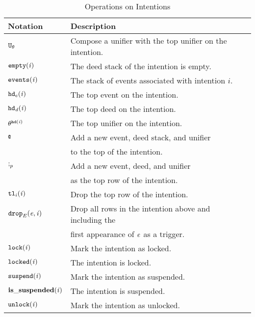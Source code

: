 \begin{table}
\begin{tabular}{llp{7cm}}
Notation  & Description \\ \hline
${\tt U}_{\theta}$ &  Compose a unifier with the top
unifier on the intention. \\


${\tt empty}(\mathit{i})$ & The deed stack of the intention
is empty. \\

${\tt events}(\mathit{i})$ & The
stack of events associated with intention $i$. \\

${\tt hd}_e(\mathit{i})$ & The top
event on the intention\index{intention!top event}. \\

$\mathit{{\tt hd}_d}(\mathit{i})$ & The top
deed on the intention\index{intention!top deed}. \\


$\theta^{{\tt hd}(\mathit{i})}$ & The top
unifier on the intention. \\

$\AILconcat$ & Add a new event, deed stack, and unifier \\
 & to
the top of the intention. \\

${\tt ;}_p$ & Add a new event, deed, and unifier \\
 & as the
top row of the intention. \\

${\tt tl}_i(\mathit{i})$ & Drop the top row of the intention. \\

${\tt drop}_E(\mathit{e}, \mathit{i})$ & Drop all rows in the intention above and including the \\
& first appearance of $\mathit{e}$ as a trigger. \\

${\tt lock}(\mathit{i})$ &  Mark the
intention as locked. \\

${\tt locked}(\mathit{i})$ & The
intention is locked\index{intention!locked}. \\

$\tt suspend(\mathit{i})$ & Mark
the intention as suspended. \\

$\bf is\_suspended(\mathit{i})$ & The intention is suspended. \\

${\tt unlock}(\mathit{i})$ & Mark the
intention as unlocked. \\
\end{tabular}
\caption{Operations on Intentions}
\label{table:intentions}
\end{table}

